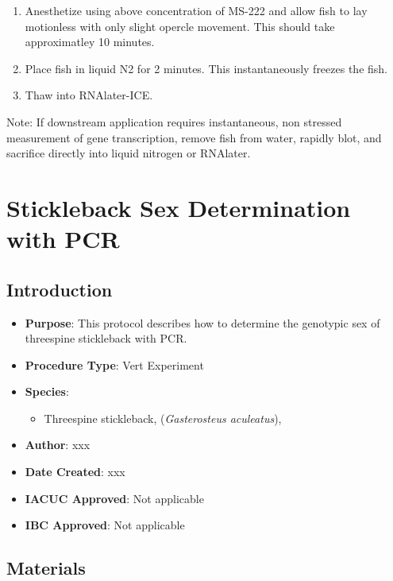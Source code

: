 \documentclass[
  letterpaper,
  DIV=11,
  numbers=noendperiod]{scrreprt}
\providecommand{\tightlist}{%
  \setlength{\itemsep}{0pt}\setlength{\parskip}{0pt}}\usepackage{longtable,booktabs,array}
\begin{document}
\begin{enumerate}
\def\labelenumi{\arabic{enumi}.}
\tightlist
\item
  Anesthetize using above concentration of MS-222 and allow fish to lay
  motionless with only slight opercle movement. This should take
  approximatley 10 minutes.
\item
  Place fish in liquid N2 for 2 minutes. This instantaneously freezes
  the fish.
\item
  Thaw into RNAlater-ICE.
\end{enumerate}

Note: If downstream application requires instantaneous, non stressed
measurement of gene transcription, remove fish from water, rapidly blot,
and sacrifice directly into liquid nitrogen or RNAlater.

\hypertarget{sec-vert_exp-SB_sex_PCR}{%
\chapter{Stickleback Sex Determination with
PCR}\label{sec-vert_exp-SB_sex_PCR}}

\hypertarget{introduction-83}{%
\section{Introduction}\label{introduction-83}}

\begin{itemize}
\tightlist
\item
  \textbf{Purpose}: This protocol describes how to determine the
  genotypic sex of threespine stickleback with PCR.
\item
  \textbf{Procedure Type}: Vert Experiment
\item
  \textbf{Species}:

  \begin{itemize}
  \tightlist
  \item
    Threespine stickleback, (\emph{Gasterosteus aculeatus}),
  \end{itemize}
\item
  \textbf{Author}: xxx
\item
  \textbf{Date Created}: xxx
\item
  \textbf{IACUC Approved}: Not applicable
\item
  \textbf{IBC Approved}: Not applicable
\end{itemize}

\hypertarget{materials-79}{%
\section{Materials}\label{materials-79}}
\end{document}
